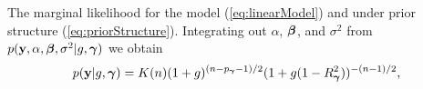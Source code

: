 The marginal likelihood for the model  (\ref{eq:linearModel}) and under prior
structure (\ref{eq:priorStructure}). 
%
Integrating out $\alpha$, ${\boldsymbol \beta}$, and $\sigma^2$ from
$p({\bf y},\alpha,{\boldsymbol \beta},\sigma^2|g,{\boldsymbol \gamma})$ we obtain
\begin{equation}\label{eq:yGivenG} \begin{array}{rl} \displaystyle p({\bf y}|g,{\boldsymbol \gamma})
        \displaystyle = K(n) (1 + g)^{(n - p_{\boldsymbol \gamma} - 1)/2}(1 + g (1 -
    R_{\boldsymbol \gamma}^2))^{-(n-1)/2}, \end{array} \end{equation}

